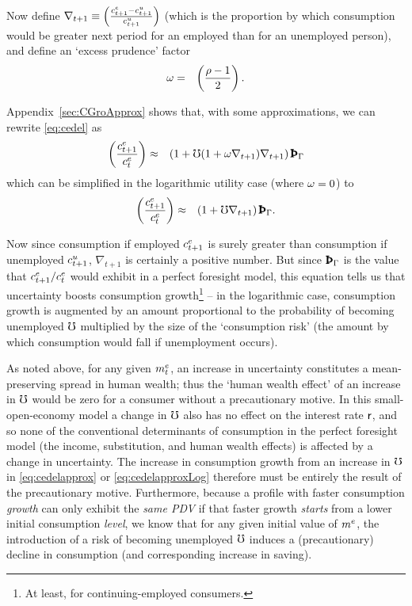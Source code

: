\documentclass{handout}
\begin{document}

Now define $\nabla _{t+1} \equiv
\left(\frac{c^{e}_{t+1}-c^{u}_{t+1}}{c^{u}_{t+1}}\right)$ (which is
the proportion by which consumption would
be greater next period for an employed than for an 
unemployed person), and define an `excess prudence' factor
\begin{eqnarray}
  \omega & = & \left(\frac{\rho-1}{2}\right).
\end{eqnarray}

Appendix~\ref{sec:CGroApprox} shows that, with some approximations, we can rewrite \eqref{eq:cedel} as
\begin{eqnarray}
         \left(\frac{\cRatE_{t+1}}{\cRatE_{t}}\right) & \approx & \left(1+ \urate (1+\prudEx\nabla _{t+1})\nabla _{t+1}\right) {\PatPGro}
         \label{eq:cedelapprox}
\end{eqnarray}
which can be simplified in the logarithmic utility case (where $\omega = 0$) to
\begin{eqnarray}
         \left(\frac{\cRatE_{t+1}}{\cRatE_{t}}\right) & \approx & \left(1+ \urate \nabla _{t+1}\right) {\PatPGro} \label{eq:cedelapproxLog}. 
\end{eqnarray}

Now since consumption if employed $c^{e}_{t+1}$ is surely greater than
consumption if unemployed $c^{u}_{t+1}$, $\nabla _{t+1}$ is
certainly a positive number.  But since ${\PatPGro}$ is the
value that $c^{e}_{t+1}/c^{e}_{t}$ would exhibit in a perfect
foresight model, this equation tells us that uncertainty boosts
consumption growth\footnote{At least, for continuing-employed consumers.} -- in the logarithmic
case, consumption growth is augmented by an amount
proportional to the probability of becoming unemployed $\mho$ multiplied
by the size of the `consumption risk' (the amount by which consumption
would fall if unemployment occurs).


As noted above, for any given $m^{e}_{t}$, an increase in uncertainty
constitutes a mean-preserving spread in human wealth; thus the `human
wealth effect' of an increase in $\mho$ would be zero for a consumer
without a precautionary motive.  In this small-open-economy model a
change in $\mho$ also has no effect on the interest rate $\mathsf{r}$,
and so none of the conventional determinants of consumption in the
perfect foresight model (the income, substitution, and human wealth
effects) is affected by a change in uncertainty.  The increase in consumption
growth from an increase in $\mho$ in
\eqref{eq:cedelapprox} or \eqref{eq:cedelapproxLog} therefore must be
entirely the result of the precautionary motive.  Furthermore, because 
a profile with faster consumption {\it growth} can only exhibit the {\it same PDV} if that faster growth 
{\it starts} from a lower initial consumption {\it level}, we know that for any given initial value of $m^{e}$, the introduction of a risk
of becoming unemployed $\mho$ induces a (precautionary) decline in consumption (and corresponding increase in
saving).
\end{document}
